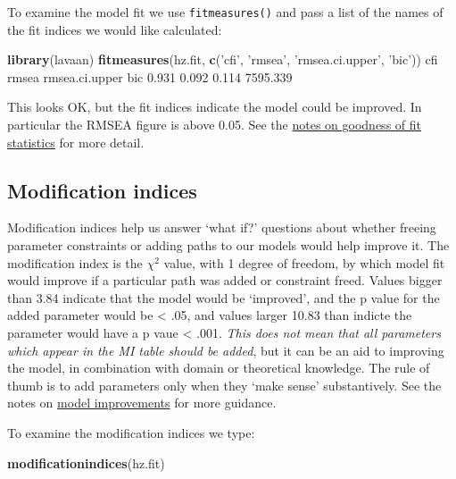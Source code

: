 \documentclass[]{article}
\newenvironment{Shaded}{\begin{snugshade}}{\end{snugshade}}
\newcommand{\FloatTok}[1]{\textcolor[rgb]{0.00,0.00,0.81}{#1}}
\newcommand{\KeywordTok}[1]{\textcolor[rgb]{0.13,0.29,0.53}{\textbf{#1}}}
\newcommand{\NormalTok}[1]{#1}
\newcommand{\StringTok}[1]{\textcolor[rgb]{0.31,0.60,0.02}{#1}}
\begin{document}
To examine the model fit we use \texttt{fitmeasures()} and pass a list of the names of
the fit indices we would like calculated:

\begin{Shaded}
\begin{Highlighting}[]
\KeywordTok{library}\NormalTok{(lavaan)}
\KeywordTok{fitmeasures}\NormalTok{(hz.fit, }\KeywordTok{c}\NormalTok{(}\StringTok{'cfi'}\NormalTok{, }\StringTok{'rmsea'}\NormalTok{, }\StringTok{'rmsea.ci.upper'}\NormalTok{, }\StringTok{'bic'}\NormalTok{))}
\NormalTok{           cfi          rmsea rmsea.ci.upper            bic }
         \FloatTok{0.931}          \FloatTok{0.092}          \FloatTok{0.114}       \FloatTok{7595.339} 
\end{Highlighting}
\end{Shaded}

This looks OK, but the fit indices indicate the model could be improved. In
particular the RMSEA figure is above 0.05. See the
\protect\hyperlink{gof}{notes on goodness of fit statistics} for more detail.

\hypertarget{modification-indices}{%
\subsection*{Modification indices}\label{modification-indices}}

Modification indices help us answer `what if?' questions about whether freeing
parameter constraints or adding paths to our models would help improve it. The
modification index is the \(\chi^2\) value, with 1 degree of freedom, by which
model fit would improve if a particular path was added or constraint freed.
Values bigger than 3.84 indicate that the model would be
`improved', and the p value for the added parameter would be \textless{} .05, and values
larger 10.83 than indicte the parameter would have a p
vaue \textless{} .001. \emph{This does not mean that all parameters which appear in the MI
table should be added}, but it can be an aid to improving the model, in
combination with domain or theoretical knowledge. The rule of thumb is to add
parameters only when they `make sense' substantively. See the notes on
\protect\hyperlink{model-improvement}{model improvements} for more guidance.

To examine the modification indices we type:

\begin{Shaded}
\begin{Highlighting}[]
\KeywordTok{modificationindices}\NormalTok{(hz.fit)}
\end{Highlighting}
\end{Shaded}
\end{document}
